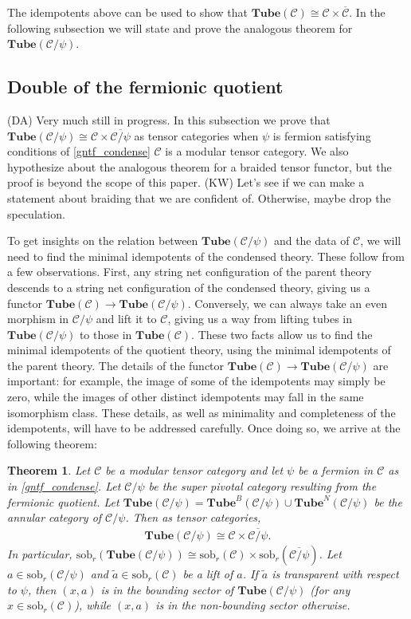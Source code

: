 \documentclass[12pt,a4paper]{article}
\newtheorem{theorem}{Theorem}[subsection]
\newcounter{arrow}
\newcommand{\mcc}{\mathcal{C}}
\newcommand{\tube}{\textbf{Tube}}
\newcommand{\sob}{\text{sob}_r}
\newcommand{\kw}[1]{{\color{kwcolor}\footnotesize{(KW) #1}}}
\newcommand{\dave}[1]{{\color{ao(english)}\footnotesize{(DA) #1}}}
\begin{document}
The idempotents above can be used to show that $\tube(\mcc) \cong \mcc \times \overline{\mcc}$.
In the following subsection we will state and prove the analogous theorem for $\tube(\mcc/\psi)$.



\subsection{Double of the fermionic quotient}
\dave{Very much still in progress.}
In this subsection we prove that $\tube(\mcc/\psi) \cong \mcc \times \overline{\mcc/\psi}$ as tensor categories
when $\psi$ is  fermion satisfying conditions of \ref{gntf_condense} $\mcc$ is a modular tensor category.
We also hypothesize about the analogous theorem for a braided tensor functor, 
but the proof is beyond the scope of this paper.
\kw{Let's see if we can make a statement about braiding that we are confident of.
Otherwise, maybe drop the speculation.}

To get insights on the relation between $\tube(\mcc/\psi)$ and the data of $\mcc$, we will need to find the minimal idempotents of the condensed theory.
These follow from a few observations. 
First, any string net configuration of the parent theory descends to a string net configuration of the condensed theory, 
giving us a functor $\tube(\mcc) \rightarrow \tube(\mcc/\psi)$.
Conversely, we can always take an even morphism in $\mcc/\psi$ and lift it to $\mcc$, giving 
us a way from lifting tubes in $\tube(\mcc/\psi)$ to those in $\tube(\mcc)$.
These two facts allow us to find the minimal idempotents of the quotient theory, 
using the minimal idempotents of the parent theory.
The details of the functor $\tube(\mcc) \rightarrow \tube(\mcc/\psi)$ are important:
for example, the image of some of the idempotents may simply be zero, 
while the images of other distinct idempotents may fall in the same isomorphism class. 
These details, as well as minimality and completeness of the idempotents, will have to be addressed carefully.
Once doing so, we arrive at the following theorem:

\begin{theorem}
Let ${\mcc}$ be a modular tensor category and let $\psi$ be a fermion in ${\mcc}$ as in \ref{gntf_condense}.
Let $\mcc/\psi$ be the super pivotal category resulting from the fermionic quotient.
Let
$
\tube(\mcc/\psi) = \tube^B(\mcc/\psi) \cup \tube^N(\mcc/\psi)
$
be the annular category of $\mcc/\psi$. 
Then as tensor categories,
\begin{align}
\tube(\mcc/\psi) \cong \mcc \times \overline{\mcc/\psi}.
\end{align}
In particular, $\sob(\tube(\mcc/\psi)) \cong \sob({\mcc}) \times \sob(\overline{\mcc/\psi})$. 
Let $a \in \sob(\mcc/\psi)$ and $\tilde{a} \in \sob({\mcc})$ be a lift of $a$.
If $\tilde a$ is transparent with respect to $\psi$, then $(x, a)$ is in the bounding sector of $\tube(\mcc/\psi)$
(for any $x\in\sob(\mcc)$), while
$(x, a)$ is in the non-bounding sector otherwise.
\label{minimal_idempotents_modular_C/psi}
\end{theorem}
\end{document}
